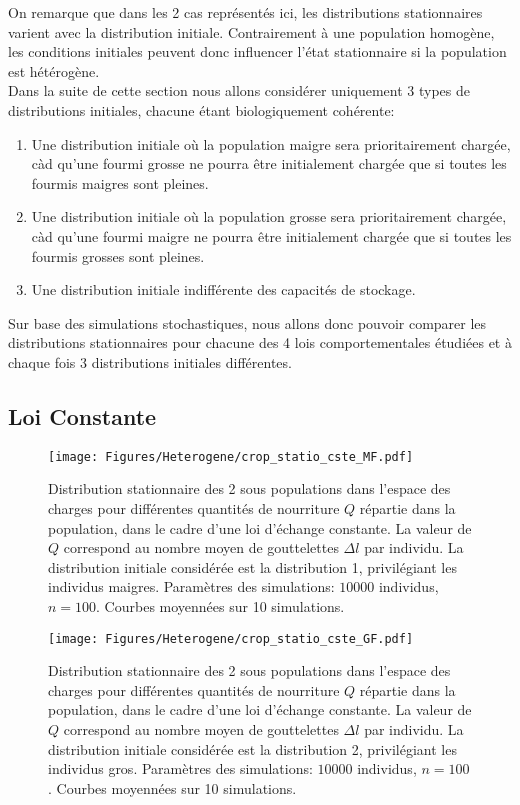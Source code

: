 On remarque que dans les 2 cas représentés ici, les distributions stationnaires varient avec la distribution initiale. Contrairement à une population homogène, les conditions initiales peuvent donc influencer l'état stationnaire si la population est hétérogène.\\

Dans la suite de cette section nous allons considérer uniquement 3 types de distributions initiales, chacune étant biologiquement cohérente:
\begin{enumerate}
\item Une distribution initiale où la population maigre sera prioritairement chargée, càd qu'une fourmi grosse ne pourra être initialement chargée que si toutes les fourmis maigres sont pleines.
\item Une distribution initiale où la population grosse sera prioritairement chargée, càd qu'une fourmi maigre ne pourra être initialement chargée que si toutes les fourmis grosses sont pleines.
\item Une distribution initiale indifférente des capacités de stockage.
\end{enumerate}


Sur base des simulations stochastiques, nous allons donc pouvoir comparer les distributions stationnaires pour chacune des 4 lois comportementales étudiées et à chaque fois 3 distributions initiales différentes.

\pagebreak
\subsection{Loi Constante}


\begin{figure}[h!]
\centering
\texttt{[image: Figures/Heterogene/crop\_statio\_cste\_MF.pdf]}
\caption{Distribution stationnaire des 2 sous populations dans l'espace des charges pour différentes quantités de nourriture $Q$ répartie dans la population, dans le cadre d'une loi d'échange constante. La valeur de $Q$ correspond au nombre moyen de gouttelettes $\Delta l$ par individu. La distribution initiale considérée est la distribution 1, privilégiant les individus maigres. Paramètres des simulations: $10000$ individus, $n=100$. Courbes moyennées sur 10 simulations.}
\label{statio_cste_MF}
\end{figure}

\begin{figure}[h!]
\centering
\texttt{[image: Figures/Heterogene/crop\_statio\_cste\_GF.pdf]}
\caption{Distribution stationnaire des 2 sous populations dans l'espace des charges pour différentes quantités de nourriture $Q$ répartie dans la population, dans le cadre d'une loi d'échange constante. La valeur de $Q$ correspond au nombre moyen de gouttelettes $\Delta l$ par individu. La distribution initiale considérée est la distribution 2, privilégiant les individus gros. Paramètres des simulations: $10000$ individus, $n=100$. Courbes moyennées sur 10 simulations.}
\label{statio_cste_GF}
\end{figure}

